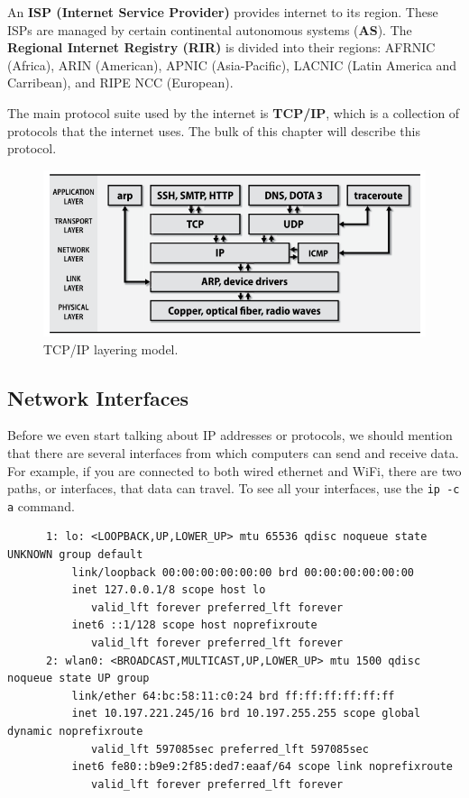 \documentclass{article}
\begin{document}
    An \textbf{ISP (Internet Service Provider)} provides internet to its region. These ISPs are managed by certain continental autonomous systems (\textbf{AS}). The \textbf{Regional Internet Registry (RIR)} is divided into their regions: AFRNIC (Africa), ARIN (American), APNIC (Asia-Pacific), LACNIC (Latin America and Carribean), and RIPE NCC (European). 

    The main protocol suite used by the internet is \textbf{TCP/IP}, which is a collection of protocols that the internet uses. The bulk of this chapter will describe this protocol. 

    \begin{figure}[hbt!]
      \centering
      \includegraphics[scale=0.7]{img/tcp_ip_model.png}
      \caption{TCP/IP layering model. }
      \label{fig:tcp_ip_model}
    \end{figure}

  \subsection{Network Interfaces}

    Before we even start talking about IP addresses or protocols, we should mention that there are several interfaces from which computers can send and receive data. For example, if you are connected to both wired ethernet and WiFi, there are two paths, or interfaces, that data can travel. To see all your interfaces, use the \texttt{ip -c a} command. 

    \begin{lstlisting} 
      1: lo: <LOOPBACK,UP,LOWER_UP> mtu 65536 qdisc noqueue state UNKNOWN group default  
          link/loopback 00:00:00:00:00:00 brd 00:00:00:00:00:00
          inet 127.0.0.1/8 scope host lo
             valid_lft forever preferred_lft forever
          inet6 ::1/128 scope host noprefixroute 
             valid_lft forever preferred_lft forever
      2: wlan0: <BROADCAST,MULTICAST,UP,LOWER_UP> mtu 1500 qdisc noqueue state UP group 
          link/ether 64:bc:58:11:c0:24 brd ff:ff:ff:ff:ff:ff
          inet 10.197.221.245/16 brd 10.197.255.255 scope global dynamic noprefixroute 
             valid_lft 597085sec preferred_lft 597085sec
          inet6 fe80::b9e9:2f85:ded7:eaaf/64 scope link noprefixroute 
             valid_lft forever preferred_lft forever
    \end{lstlisting}
\end{document}

